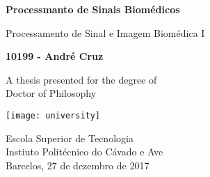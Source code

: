 \begin{titlepage}
    \begin{center}
        
        \vspace*{1cm}
        
        \textbf{Processmanto de Sinais Biomédicos}
        
        \vspace{0.5cm}
        Processamento de Sinal e Imagem Biomédica I
        
        \vspace{1.5cm}
        
        \textbf{10199 - André Cruz}
        
        \vfill
        
        A thesis presented for the degree of\\
        Doctor of Philosophy
        
        \vspace{0.8cm}
        
        \texttt{[image: university]}
        
        Escola Superior de Tecnologia\\
        Instiuto Politécnico do Cávado e Ave\\
        Barcelos, 27 de dezembro de 2017
        
    \end{center}
\end{titlepage}